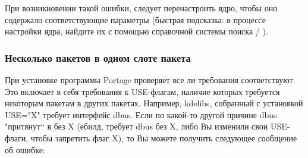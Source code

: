 \documentclass[10pt]{book}
\begin{document}
При возникновении такой ошибки, следует перенастроить ядро, чтобы оно содержало соответствующие параметры  (быстрая подсказка: в процессе настройки ядра, найдите их с помощью справочной системы поиска / ).

\subsubsection{Несколько пакетов в одном слоте пакета}

При установке программы Portage проверяет все ли требования соответствуют. Это включает в себя требования к USE-флагам, наличие которых требуется некоторым пакетам в других пакетах. Например, kdelibs, собранный с установкой USE="X" требует интерфейс dbus. Если по какой-то другой причине dbus "притянут`` в без X (ебилд, требует dbus без X, либо Вы изменили свои USE-флаги, чтобы запретить флаг X), то Вы можете получить следующее сообщение об ошибке:
\end{document}
